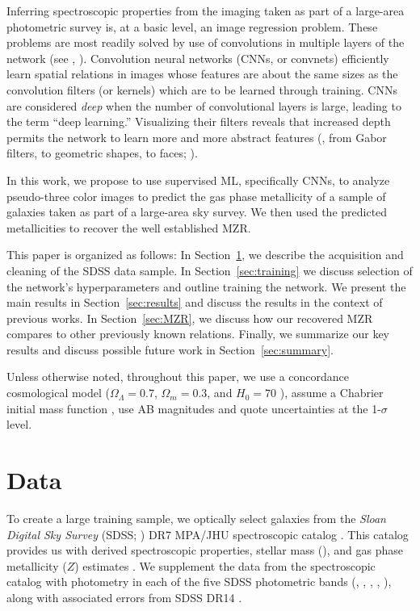 \documentclass[fleqn,usenatbib]{mnras}
\begin{document}
Inferring spectroscopic properties from the imaging taken as part of a large-area photometric survey is, at a basic level, an image regression problem. These problems are most readily solved by use of convolutions in multiple layers of the network (see \eg, \citealt{Krizhevsky2012}). Convolution neural networks (CNNs, or convnets) efficiently learn spatial relations in images whose features are about the same sizes as the convolution filters (or kernels) which are to be learned through training. CNNs are considered \textit{deep} when the number of convolutional layers is large, leading to the term ``deep learning.'' Visualizing their filters reveals that increased depth permits the network to learn more and more abstract features (\eg, from Gabor filters, to geometric shapes, to faces; \citealt{Zeiler2014}).

In this work, we propose to use supervised ML, specifically CNNs, to analyze pseudo-three color images to predict the gas phase metallicity of a sample of galaxies taken as part of a large-area sky survey. We then used the predicted metallicities to recover the well established MZR.

This paper is organized as follows: In Section~\ref{sec:data}, we describe the acquisition and cleaning of the SDSS data sample. In Section~\ref{sec:training} we discuss selection of the network's hyperparameters and outline training the network. We present the main results in Section~\ref{sec:results} and discuss the results in the context of previous works. In Section~\ref{sec:MZR}, we discuss how our recovered MZR compares to other previously known relations. Finally, we summarize our key results and discuss possible future work in Section~\ref{sec:summary}.

Unless otherwise noted, throughout this paper, we use a concordance cosmological model ($\Omega_\Lambda = 0.7$, $\Omega_m = 0.3$, and $H_0= 70$ \kms \permpc), assume a Chabrier initial mass function \citep{Chabrier2003}, use AB magnitudes \citep{Oke1974} and quote uncertainties at the 1-$\sigma$ level.

\section{Data} \label{sec:data}
To create a large training sample, we optically select galaxies from the \textit{Sloan Digital Sky Survey} (SDSS; \citealt{York2000}) DR7 MPA/JHU spectroscopic catalog \citep{Kauffmann2003a, Brinchmann2004, Salim2007}. This catalog provides us with derived spectroscopic properties, stellar mass (\mstar), and gas phase metallicity ($Z$) estimates \citep{Tremonti2004}. We supplement the data from the spectroscopic catalog with photometry in each of the five SDSS photometric bands (\sdssu, \sdssg, \sdssr, \sdssi, \sdssz), along with associated errors from SDSS DR14 \citep{Abolfathi2017}.
\end{document}
